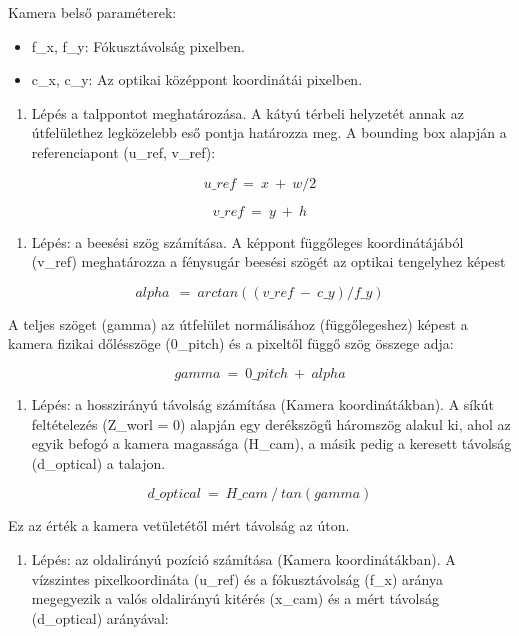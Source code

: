 Kamera belső paraméterek:

\begin{itemize}
\item
  f\_x, f\_y: Fókusztávolság pixelben.
\item
  c\_x, c\_y: Az optikai középpont koordinátái pixelben.
\end{itemize}

\begin{enumerate}
\def\labelenumi{\arabic{enumi}.}
\item
  Lépés a talppontot meghatározása. A kátyú térbeli helyzetét annak az
  útfelülethez legközelebb eső pontja határozza meg. A bounding box
  alapján a referenciapont (u\_ref, v\_ref):
\end{enumerate}

\[u\_ ref\  = \ x\  + \ w/2\]

\[v\_ ref\  = \ y\  + \ h\]

\begin{enumerate}
\def\labelenumi{\arabic{enumi}.}
\setcounter{enumi}{1}
\item
  Lépés: a beesési szög számítása. A képpont függőleges koordinátájából
  (v\_ref) meghatározza a fénysugár beesési szögét az optikai tengelyhez
  képest
\end{enumerate}

\[alpha\ \  = \ arctan((v\_ ref\  - \ c\_ y)/f\_ y)\]

A teljes szöget (gamma) az útfelület normálisához (függőlegeshez) képest
a kamera fizikai dőlésszöge (0\_pitch) és a pixeltől függő szög összege
adja:

\[gamma\  = \ 0\_ pitch\  + \ alpha\]

\begin{enumerate}
\def\labelenumi{\arabic{enumi}.}
\setcounter{enumi}{2}
\item
  Lépés: a hosszirányú távolság számítása (Kamera koordinátákban). A
  síkút feltételezés (Z\_worl = 0) alapján egy derékszögű háromszög
  alakul ki, ahol az egyik befogó a kamera magassága (H\_cam), a másik
  pedig a keresett távolság (d\_optical) a talajon.
\end{enumerate}

\[d\_ optical\  = \ H\_ cam\ /\ tan(gamma)\]

Ez az érték a kamera vetületétől mért távolság az úton.

\begin{enumerate}
\def\labelenumi{\arabic{enumi}.}
\setcounter{enumi}{3}
\item
  Lépés: az oldalirányú pozíció számítása (Kamera koordinátákban). A
  vízszintes pixelkoordináta (u\_ref) és a fókusztávolság (f\_x) aránya
  megegyezik a valós oldalirányú kitérés (x\_cam) és a mért távolság
  (d\_optical) arányával:
\end{enumerate}

